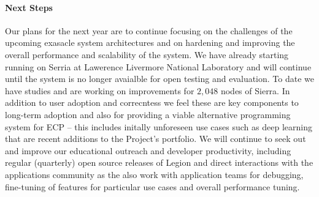 \paragraph{Next Steps}
Our plans for the next year are to continue focusing on the challenges
of the upcoming exasacle system architectures and on hardening and
improving the overall performance and scalability of the system.  We
have already starting running on Serria at Lawerence Livermore
National Laboratory and will continue until the system is no longer
avaialble for open testing and evaluation.  To date we have studies
and are working on improvements for $2,048$ nodes of Sierra. In
addition to user adoption and correcntess we feel these are key
components to long-term adoption and also for providing a viable
alternative programming system for ECP -- this includes initally
unforeseen use cases such as deep learning that are recent additions
to the Project's portfolio.  We will continue to seek out and improve
our educational outreach and developer productivity, including regular
(quarterly) open source releases of Legion and direct interactions
with the applications community as the also work with application
teams for debugging, fine-tuning of features for particular use cases
and overall performance tuning.
